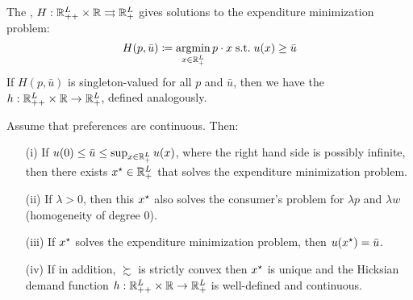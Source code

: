 \documentclass[12pt]{article}
\begin{document}
\begin{definition}
	The , $H: \mathbb{R}_{++}^L \times \mathbb{R} \rightrightarrows \mathbb{R}_+^L$ gives solutions to the expenditure minimization problem:
	\[
	H(p,\bar{u}) \coloneqq  \mathop{\rm argmin}_{x \in \mathbb{R}^L_+} p \cdot x \;\text{s.t.}\; u(x) \ge \bar{u}
	\]
	If $H(p,\bar{u})$ is singleton-valued for all $p$ and $\bar{u}$, then we have the  $h: \mathbb{R}_{++}^L \times \mathbb{R} \to \mathbb{R}_+^L$, defined analogously.
\end{definition}

\begin{proposition}\label{prop:hicksian_properties}
	 Assume that preferences are continuous. Then:
	\begin{itemize}
		\item[(i)] If $u(0) \le \bar{u} \le \sup_{x \in \mathbb{R}^L_+} u(x)$, where the right hand side is possibly infinite, then there exists $x^\star \in \mathbb{R}^L_+$ that solves the expenditure minimization problem.
		\item[(ii)] If $\lambda > 0$, then this $x^\star$ also solves the consumer's problem for $\lambda p$ and $\lambda w$ (homogeneity of degree 0).
		\item[(iii)] If $x^\star$ solves the expenditure minimization problem, then $u(x^\star) = \bar{u}$.
		\item[(iv)] If in addition, $\succsim$ is strictly convex then $x^\star$ is unique and the Hicksian demand function $h: \mathbb{R}_{++}^L \times \mathbb{R} \to \mathbb{R}_+^L$ is well-defined and continuous.
	\end{itemize}
\end{proposition}
\end{document}
